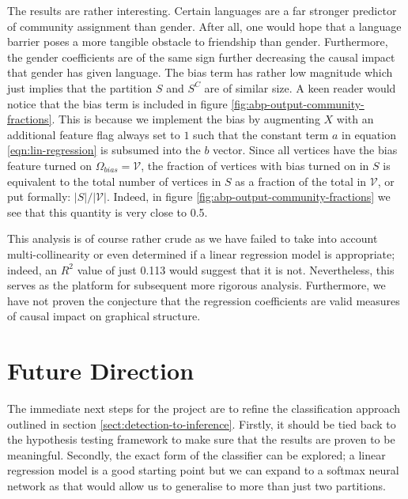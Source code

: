 \documentclass[]{article}
\newcommand{\Vcal}{\mathcal{V}}
\begin{document}
\begin{multicols*}{2}
The results are rather interesting. Certain languages are a far stronger predictor of community assignment than gender. After all, one would hope that a language barrier poses a more tangible obstacle to friendship than gender. Furthermore, the gender coefficients are of the same sign further decreasing the causal impact that gender has given language. The bias term has rather low magnitude which just implies that the partition $S$ and $S^C$ are of similar size. A keen reader would notice that the bias term is included in figure \ref{fig:abp-output-community-fractions}. This is because we implement the bias by augmenting $X$ with an additional feature flag always set to $1$ such that the constant term $a$ in equation \ref{eqn:lin-regression} is subsumed into the $b$ vector. Since all vertices have the bias feature turned on $\Omega_{bias} = \Vcal$, the fraction of vertices with bias turned on in $S$ is equivalent to the total number of vertices in $S$ as a fraction of the total in $\Vcal$, or put formally: $|S| / |\Vcal|$. Indeed, in figure \ref{fig:abp-output-community-fractions} we see that this quantity is very close to 0.5.

This analysis is of course rather crude as we have failed to take into account multi-collinearity or even determined if a linear regression model is appropriate; indeed, an $R^2$ value of just 0.113 would suggest that it is not. Nevertheless, this serves as the platform for subsequent more rigorous analysis. Furthermore, we have not proven the conjecture that the regression coefficients are valid measures of causal impact on graphical structure.

\section{Future Direction}

The immediate next steps for the project are to refine the classification approach outlined in section \ref{sect:detection-to-inference}. Firstly, it should be tied back to the hypothesis testing framework to make sure that the results are proven to be meaningful. Secondly, the exact form of the classifier can be explored; a linear regression model is a good starting point but we can expand to a softmax neural network as that would allow us to generalise to more than just two partitions.


\end{multicols*}
\end{document}
